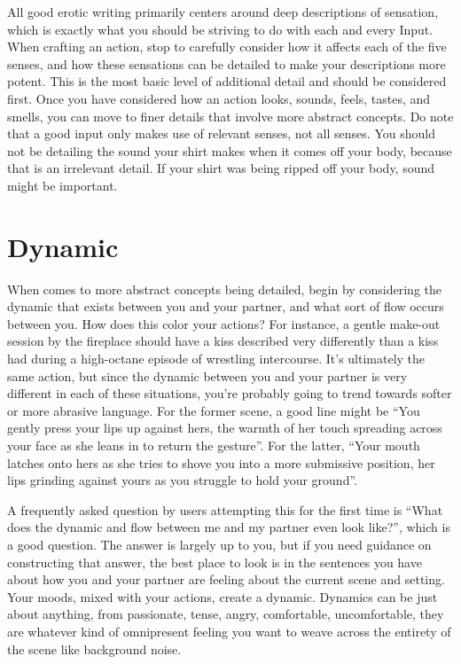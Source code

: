 \documentclass[Coomer-main.tex]{subfiles}
\begin{document}
All good erotic writing primarily centers around deep descriptions of sensation, which is exactly what you should be striving to do with each and every Input.
When crafting an action, stop to carefully consider how it affects each of the five senses, and how these sensations can be detailed to make your descriptions more potent.
This is the most basic level of additional detail and should be considered first.
Once you have considered how an action looks, sounds, feels, tastes, and smells, you can move to finer details that involve more abstract concepts.
Do note that a good input only makes use of relevant senses, not all senses.
You should not be detailing the sound your shirt makes when it comes off your body, because that is an irrelevant detail.
If your shirt was being ripped off your body, sound might be important.

\section{Dynamic}

When comes to more abstract concepts being detailed, begin by considering the dynamic that exists between you and your partner, and what sort of flow occurs between you.
How does this color your actions? For instance, a gentle make-out session by the fireplace should have a kiss described very differently than a kiss had during a high-octane episode of wrestling intercourse.
It’s ultimately the same action, but since the dynamic between you and your partner is very different in each of these situations, you’re probably going to trend towards softer or more abrasive language.
For the former scene, a good line might be “You gently press your lips up against hers, the warmth of her touch spreading across your face as she leans in to return the gesture”.
For the latter, “Your mouth latches onto hers as she tries to shove you into a more submissive position, her lips grinding against yours as you struggle to hold your ground”.

A frequently asked question by users attempting this for the first time is “What does the dynamic and flow between me and my partner even look like?”, which is a good question.
The answer is largely up to you, but if you need guidance on constructing that answer, the best place to look is in the \rem sentences you have about how you and your partner are feeling about the current scene and setting.
Your moods, mixed with your actions, create a dynamic.
Dynamics can be just about anything, from passionate, tense, angry, comfortable, uncomfortable, they are whatever kind of omnipresent feeling you want to weave across the entirety of the scene like background noise.
\end{document}
